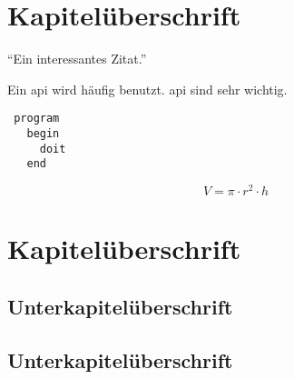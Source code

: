 \documentclass{custom}
\begin{document}
\begin{frontmatter}

\mycover
\myconfidentiality
\mytableofcontents
\mylistoffigures
\mylistoftables
\mylistofacronyms

\end{frontmatter}

\begin{mainmatter}

\section{Kapitelüberschrift}

\enquote{Ein interessantes Zitat.} \cite[1]{test}

Ein \gls{api} wird häufig benutzt. \gls{api} sind sehr wichtig.

\begin{verbatim}
 program
   begin
     doit
   end
\end{verbatim}

\begin{equation}
V= \pi \cdot r^{2} \cdot h
\end{equation}

\lipsum

\section{Kapitelüberschrift}

\lipsum

\subsection{Unterkapitelüberschrift}

\lipsum

\subsection{Unterkapitelüberschrift}

\lipsum

\end{mainmatter}

\begin{backmatter}

\mybibliography

\mylistofappendices


\mydeclaration

\end{backmatter}
\end{document}
